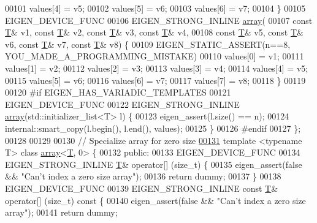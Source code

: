 \begin{DoxyCode}
00101     values[4] = v5;
00102     values[5] = v6;
00103     values[6] = v7;
00104   \}
00105   EIGEN\_DEVICE\_FUNC
00106   EIGEN\_STRONG\_INLINE \hyperlink{class_eigen_1_1array}{array}(
00107       \textcolor{keyword}{const} \hyperlink{group___sparse_core___module}{T}& v1, \textcolor{keyword}{const} \hyperlink{group___sparse_core___module}{T}& v2, \textcolor{keyword}{const} \hyperlink{group___sparse_core___module}{T}& v3, \textcolor{keyword}{const} \hyperlink{group___sparse_core___module}{T}& v4,
00108       \textcolor{keyword}{const} \hyperlink{group___sparse_core___module}{T}& v5, \textcolor{keyword}{const} \hyperlink{group___sparse_core___module}{T}& v6, \textcolor{keyword}{const} \hyperlink{group___sparse_core___module}{T}& v7, \textcolor{keyword}{const} \hyperlink{group___sparse_core___module}{T}& v8) \{
00109     EIGEN\_STATIC\_ASSERT(n==8, YOU\_MADE\_A\_PROGRAMMING\_MISTAKE)
00110     values[0] = v1;
00111     values[1] = v2;
00112     values[2] = v3;
00113     values[3] = v4;
00114     values[4] = v5;
00115     values[5] = v6;
00116     values[6] = v7;
00117     values[7] = v8;
00118   \}
00119 
00120 \textcolor{preprocessor}{#if EIGEN\_HAS\_VARIADIC\_TEMPLATES}
00121   EIGEN\_DEVICE\_FUNC
00122   EIGEN\_STRONG\_INLINE \hyperlink{class_eigen_1_1array}{array}(std::initializer\_list<T> l) \{
00123     eigen\_assert(l.size() == n);
00124     internal::smart\_copy(l.begin(), l.end(), values);
00125   \}
00126 \textcolor{preprocessor}{#endif}
00127 \};
00128 
00129 
00130 \textcolor{comment}{// Specialize array for zero size}
\hyperlink{class_eigen_1_1array_3_01_t_00_010_01_4}{00131} \textcolor{keyword}{template} <\textcolor{keyword}{typename} T> \textcolor{keyword}{class }\hyperlink{class_eigen_1_1array}{array}<\hyperlink{group___sparse_core___module}{T}, 0> \{
00132  \textcolor{keyword}{public}:
00133   EIGEN\_DEVICE\_FUNC
00134   EIGEN\_STRONG\_INLINE \hyperlink{group___sparse_core___module}{T}& operator[] (\textcolor{keywordtype}{size\_t}) \{
00135     eigen\_assert(\textcolor{keyword}{false} && \textcolor{stringliteral}{"Can't index a zero size array"});
00136     \textcolor{keywordflow}{return} dummy;
00137   \}
00138   EIGEN\_DEVICE\_FUNC
00139   EIGEN\_STRONG\_INLINE \textcolor{keyword}{const} \hyperlink{group___sparse_core___module}{T}& operator[] (\textcolor{keywordtype}{size\_t})\textcolor{keyword}{ const }\{
00140     eigen\_assert(\textcolor{keyword}{false} && \textcolor{stringliteral}{"Can't index a zero size array"});
00141     \textcolor{keywordflow}{return} dummy;

\end{DoxyCode}
